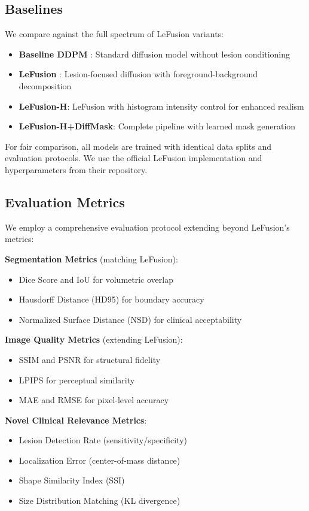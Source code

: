 \documentclass[10pt,twocolumn,letterpaper]{article}
\begin{document}
\subsection{Baselines}

We compare against the full spectrum of LeFusion variants:
\begin{itemize}
    \item \textbf{Baseline DDPM} \cite{ho2020denoising}: Standard diffusion model without lesion conditioning
    \item \textbf{LeFusion} \cite{zhang2025lefusion}: Lesion-focused diffusion with foreground-background decomposition
    \item \textbf{LeFusion-H}: LeFusion with histogram intensity control for enhanced realism
    \item \textbf{LeFusion-H+DiffMask}: Complete pipeline with learned mask generation
\end{itemize}

For fair comparison, all models are trained with identical data splits and evaluation protocols. We use the official LeFusion implementation and hyperparameters from their repository.

\subsection{Evaluation Metrics}

We employ a comprehensive evaluation protocol extending beyond LeFusion's metrics:

\textbf{Segmentation Metrics} (matching LeFusion):
\begin{itemize}
    \item Dice Score and IoU for volumetric overlap
    \item Hausdorff Distance (HD95) for boundary accuracy
    \item Normalized Surface Distance (NSD) for clinical acceptability
\end{itemize}

\textbf{Image Quality Metrics} (extending LeFusion):
\begin{itemize}
    \item SSIM and PSNR for structural fidelity
    \item LPIPS for perceptual similarity
    \item MAE and RMSE for pixel-level accuracy
\end{itemize}

\textbf{Novel Clinical Relevance Metrics}:
\begin{itemize}
    \item Lesion Detection Rate (sensitivity/specificity)
    \item Localization Error (center-of-mass distance)
    \item Shape Similarity Index (SSI)
    \item Size Distribution Matching (KL divergence)
\end{itemize}
\end{document}
